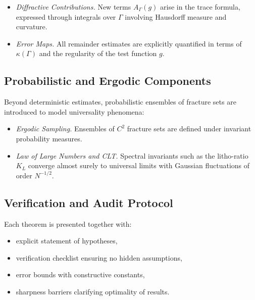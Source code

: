 \begin{itemize}
    \item \emph{Diffractive Contributions.} 
    New terms $A_\Gamma(g)$ arise in the trace formula, expressed through 
    integrals over $\Gamma$ involving Hausdorff measure and curvature.

    \item \emph{Error Maps.} 
    All remainder estimates are explicitly quantified in terms of $\kappa(\Gamma)$ 
    and the regularity of the test function $g$.
\end{itemize}

\subsection*{Probabilistic and Ergodic Components}

Beyond deterministic estimates, probabilistic ensembles of fracture sets are 
introduced to model universality phenomena:

\begin{itemize}
    \item \emph{Ergodic Sampling.} 
    Ensembles of $C^2$ fracture sets are defined under invariant probability measures. 

    \item \emph{Law of Large Numbers and CLT.}
    Spectral invariants such as the litho-ratio $K_L$ converge almost surely 
    to universal limits with Gaussian fluctuations of order $N^{-1/2}$.
\end{itemize}

\subsection*{Verification and Audit Protocol}

Each theorem is presented together with:

\begin{itemize}
    \item explicit statement of hypotheses,
    \item verification checklist ensuring no hidden assumptions,
    \item error bounds with constructive constants,
    \item sharpness barriers clarifying optimality of results.
\end{itemize}

